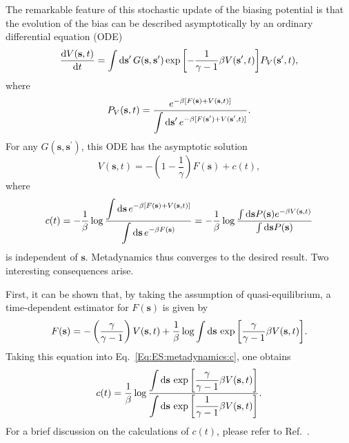 The remarkable feature of this stochastic update of the biasing potential is that the evolution of the bias can be described asymptotically by an ordinary differential equation (ODE)\cite{DamaPRL2014,TiwaryJCP2015}
\begin{equation}
    \frac{\mathop{}\!\mathrm{d} V(\mathbf{s},t)}{\mathop{}\!\mathrm{d} t}=\int \mathop{}\!\mathrm{d} \mathbf{s}^\prime\, G(\mathbf{s},\mathbf{s}^\prime)\exp{\left[-\frac{1}{\gamma-1}\beta V(\mathbf{s}^\prime,t)\right]}P_V(\mathbf{s}^\prime,t),
\end{equation}
where
\begin{equation}
    P_V(\mathbf{s},t)=\frac{e^{-\beta[F(\mathbf{s})+V(\mathbf{s},t)]}}{\displaystyle\int \mathop{}\!\mathrm{d} \mathbf{s}^\prime\, e^{-\beta[F(\mathbf{s}^\prime)+V(\mathbf{s}^\prime,t)]}}.
\end{equation}
For any $G(\mathbf{s},\mathbf{s}^\prime)$, this ODE has the asymptotic solution
\begin{equation}
    V(\mathbf{s},t)=-\left(1-\frac{1}{\gamma}\right)F(\mathbf{s})+c(t),
\end{equation}
where
\begin{equation}
    c(t)=-\frac{1}{\beta}\log{\frac{\displaystyle\int \mathop{}\!\mathrm{d}\mathbf{s}\, e^{-\beta \left[F(\mathbf{s})+V(\mathbf{s},t)\right]}}{\displaystyle\int \mathop{}\!\mathrm{d}\mathbf{s}\, e^{-\beta F(\mathbf{s})}}}=-\frac{1}{\beta}\log{\frac{\int \mathop{}\!\mathrm{d}\mathbf{s}P(\mathbf{s})e^{-\beta V(\mathbf{s},t)}}{\int \mathop{}\!\mathrm{d}\mathbf{s}P(\mathbf{s})}}
    \label{Eq:ES:metadynamics:c}
\end{equation}
is independent of $\mathbf{s}$. Metadynamics thus converges to the desired result. Two interesting consequences arise.

First, it can be shown that, by taking the assumption of quasi-equilibrium, a time-dependent estimator for $F(\mathbf{s})$ is given by\cite{TiwaryJPCB2015}
\begin{equation}
    F(\mathbf{s})=-\left(\frac{\gamma}{\gamma -1}\right)V(\mathbf{s},t)+\frac{1}{\beta}\log{\int \mathop{}\!\mathrm{d}\mathbf{s}\, \exp{\left[\frac{\gamma}{\gamma-1}\beta V(\mathbf{s},t)\right]}}.
    \label{eq:ES:metadynamics:FsFromBiasedPotential}
\end{equation}
Taking this equation into Eq.~\ref{Eq:ES:metadynamics:c}, one obtains
\begin{equation}
    c(t)=\frac{1}{\beta}\log{\frac{\displaystyle\int \mathop{}\!\mathrm{d}\mathbf{s}\,\exp{\left[\frac{\gamma}{\gamma-1}\beta V(\mathbf{s},t)\right]}}{\displaystyle\int \mathop{}\!\mathrm{d}\mathbf{s}\,\exp{\left[\frac{1}{\gamma-1}\beta V(\mathbf{s},t)\right]}}}.
\end{equation}
For a brief discussion on the calculations of $c(t)$, please refer to Ref.~\cite{GibertiJCTC2020}.


